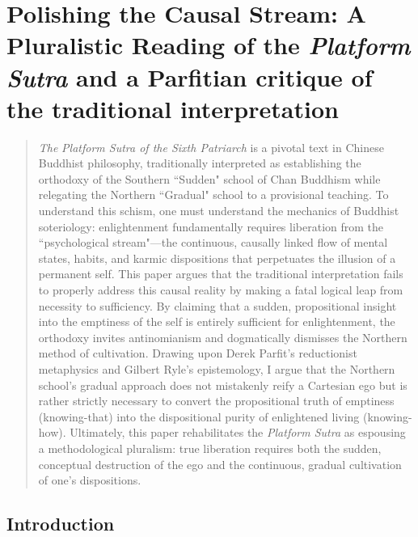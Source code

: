 \chapter{Polishing the Causal Stream: A Pluralistic Reading of the \emph{Platform Sutra} and a Parfitian critique of the traditional interpretation}

\renewcommand*{\thesection}{\arabic{section}.}
\renewcommand*{\thesubsection}{\arabic{section}.\arabic{subsection}.}

\begin{quote}
    \emph{The} \emph{Platform Sutra of the Sixth Patriarch} is a pivotal text in Chinese Buddhist philosophy, traditionally interpreted as establishing the orthodoxy of the Southern ``Sudden" school of Chan Buddhism while relegating the Northern ``Gradual" school to a provisional teaching. To understand this schism, one must understand the mechanics of Buddhist soteriology: enlightenment fundamentally requires liberation from the ``psychological stream"---the continuous, causally linked flow of mental states, habits, and karmic dispositions that perpetuates the illusion of a permanent self. This paper argues that the traditional interpretation fails to properly address this causal reality by making a fatal logical leap from necessity to sufficiency. By claiming that a sudden, propositional insight into the emptiness of the self is entirely sufficient for enlightenment, the orthodoxy invites antinomianism and dogmatically dismisses the Northern method of cultivation. Drawing upon Derek Parfit's reductionist metaphysics and Gilbert Ryle's epistemology, I argue that the Northern school's gradual approach does not mistakenly reify a Cartesian ego but is rather strictly necessary to convert the propositional truth of emptiness (knowing-that) into the dispositional purity of enlightened living (knowing-how). Ultimately, this paper rehabilitates the \emph{Platform Sutra} as espousing a methodological pluralism: true liberation requires both the sudden, conceptual destruction of the ego and the continuous, gradual cultivation of one's dispositions.
\end{quote}

\vspace{\credgap}

\section{Introduction}

